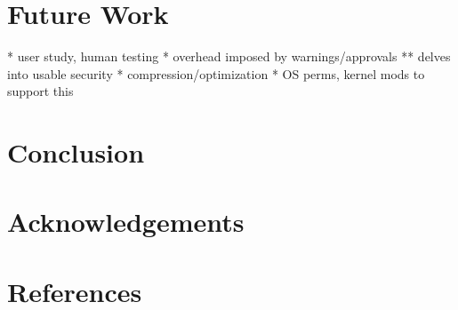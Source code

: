 \documentclass[12pt]{article}
\begin{document}
\section{Future Work}
* user study, human testing
* overhead imposed by warnings/approvals
** delves into usable security
* compression/optimization
* OS perms, kernel mods to support this

\section{Conclusion}

\section{Acknowledgements}

\section{References}
\end{document}
